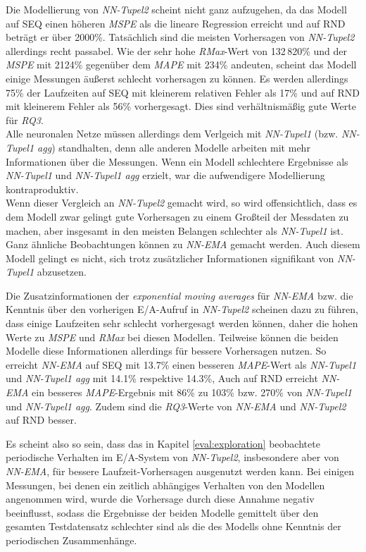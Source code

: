 \documentclass[
	12pt,
	a4paper,
	BCOR10mm,
	DIV14,
	listof=totoc,
	bibliography=totoc,
	headsepline
]{scrreprt}
\begin{document}
Die Modellierung von \textit{NN-Tupel2} scheint nicht ganz aufzugehen, da das Modell auf SEQ einen höheren \textit{MSPE} als die lineare Regression erreicht und auf RND beträgt er über 2000\%.
Tatsächlich sind die meisten Vorhersagen von \textit{NN-Tupel2} allerdings recht passabel.
Wie der sehr hohe \textit{RMax}-Wert von 132\,820\% und der \textit{MSPE} mit 2124\% gegenüber dem \textit{MAPE} mit 234\% andeuten, scheint das Modell einige Messungen äußerst schlecht vorhersagen zu können.
Es werden allerdings 75\% der Laufzeiten auf SEQ mit kleinerem relativen Fehler als 17\% und auf RND mit kleinerem Fehler als 56\% vorhergesagt. Dies sind verhältnismäßig gute Werte für \textit{RQ3}.\\
Alle neuronalen Netze müssen allerdings dem Verlgeich mit \textit{NN-Tupel1} (bzw. \textit{NN-Tupel1 agg}) standhalten, denn alle anderen Modelle arbeiten mit mehr Informationen über die Messungen.
Wenn ein Modell schlechtere Ergebnisse als \textit{NN-Tupel1} und \textit{NN-Tupel1 agg} erzielt, war die aufwendigere Modellierung kontraproduktiv.\\
Wenn dieser Vergleich an \textit{NN-Tupel2} gemacht wird, so wird offensichtlich, dass es dem Modell zwar gelingt gute Vorhersagen zu einem Großteil der Messdaten zu machen, aber insgesamt in den meisten Belangen schlechter als \textit{NN-Tupel1} ist.\\
Ganz ähnliche Beobachtungen können zu \textit{NN-EMA} gemacht werden.
Auch diesem Modell gelingt es nicht, sich trotz zusätzlicher Informationen signifikant von \textit{NN-Tupel1} abzusetzen.\medskip

Die Zusatzinformationen der \textit{exponential moving averages} für \textit{NN-EMA} bzw. die Kenntnis über den vorherigen E/A-Aufruf in \textit{NN-Tupel2} scheinen dazu zu führen, dass einige Laufzeiten sehr schlecht vorhergesagt werden können, daher die hohen Werte zu \textit{MSPE} und \textit{RMax} bei diesen Modellen.
Teilweise können die beiden Modelle diese Informationen allerdings für bessere Vorhersagen nutzen. So erreicht \textit{NN-EMA} auf SEQ mit 13.7\% einen besseren \textit{MAPE}-Wert als \textit{NN-Tupel1} und \textit{NN-Tupel1 agg} mit 14.1\% respektive 14.3\%, 
Auch auf RND erreicht \textit{NN-EMA} ein besseres \textit{MAPE}-Ergebnis mit 86\% zu 103\% bzw. 270\% von \textit{NN-Tupel1} und \textit{NN-Tupel1 agg}.
Zudem sind die \textit{RQ3}-Werte von \textit{NN-EMA} und \textit{NN-Tupel2} auf RND besser.\medskip

Es scheint also so sein, dass das in Kapitel \ref{eval:exploration} beobachtete periodische Verhalten im E/A-System von \textit{NN-Tupel2}, insbesondere aber von \textit{NN-EMA}, für bessere Laufzeit-Vorhersagen ausgenutzt werden kann.
Bei einigen Messungen, bei denen ein zeitlich abhängiges Verhalten von den Modellen angenommen wird, wurde die Vorhersage durch diese Annahme negativ beeinflusst, sodass die Ergebnisse der beiden Modelle gemittelt über den gesamten Testdatensatz schlechter sind als die des Modells ohne Kenntnis der periodischen Zusammenhänge.
\end{document}
